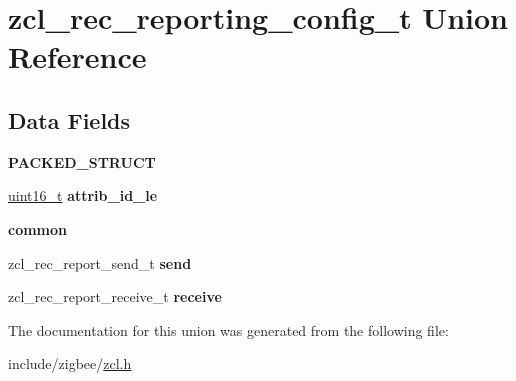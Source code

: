 \hypertarget{unionzcl__rec__reporting__config__t}{\section{zcl\-\_\-rec\-\_\-reporting\-\_\-config\-\_\-t Union Reference}
\label{unionzcl__rec__reporting__config__t}
}
\subsection*{Data Fields}
\begin{DoxyCompactItemize}
\item 
{\bfseries P\-A\-C\-K\-E\-D\-\_\-\-S\-T\-R\-U\-C\-T}
\item 
\hypertarget{group__zcl_ga21f7dfce4361ae19ae7e96c34c5847bc}{\hyperlink{group__hal_ga5a8b2dc9e45a9ee81a94ef304fb62505}{uint16\-\_\-t} {\bfseries attrib\-\_\-id\-\_\-le}}\label{group__zcl_ga21f7dfce4361ae19ae7e96c34c5847bc}

\item 
\hypertarget{group__zcl_gaf0916fb62ad7f1acdcd1c264608dfe6b}{{\bfseries common}}\label{group__zcl_gaf0916fb62ad7f1acdcd1c264608dfe6b}

\item 
\hypertarget{group__zcl_gaaaef83599eb50b682857d7e1e6acf45d}{zcl\-\_\-rec\-\_\-report\-\_\-send\-\_\-t {\bfseries send}}\label{group__zcl_gaaaef83599eb50b682857d7e1e6acf45d}

\item 
\hypertarget{group__zcl_ga5b72b8ed4593e1c792c061de064aa5df}{zcl\-\_\-rec\-\_\-report\-\_\-receive\-\_\-t {\bfseries receive}}\label{group__zcl_ga5b72b8ed4593e1c792c061de064aa5df}

\end{DoxyCompactItemize}


The documentation for this union was generated from the following file\-:\begin{DoxyCompactItemize}
\item 
include/zigbee/\hyperlink{zcl_8h}{zcl.\-h}\end{DoxyCompactItemize}
